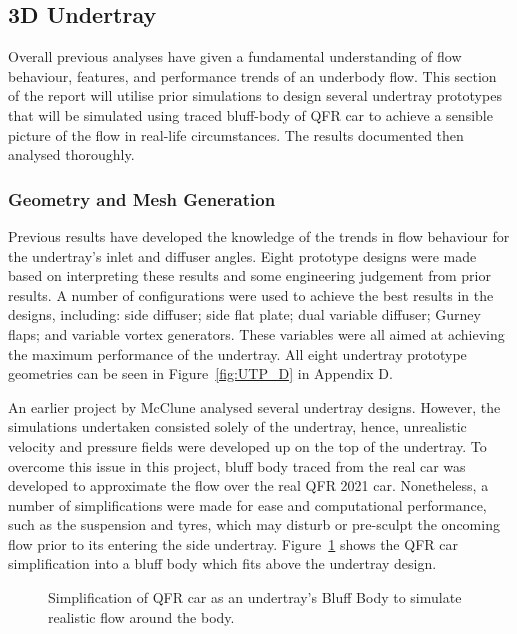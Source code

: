 
\subsection{3D Undertray}
Overall previous analyses have given a fundamental understanding of flow behaviour, features, and performance trends of an underbody flow. This section of the report will utilise prior simulations to design several undertray prototypes that will be simulated using traced bluff-body of QFR car to achieve a sensible picture of the flow in real-life circumstances. The results documented then analysed thoroughly.

\subsubsection{Geometry and Mesh Generation}
\noindent Previous results have developed the knowledge of the trends in flow behaviour for the undertray's inlet and diffuser angles. Eight prototype designs were made based on interpreting these results and some engineering judgement from prior results. A number of configurations were used to achieve the best results in the designs, including: side diffuser; side flat plate; dual variable diffuser; Gurney flaps; and variable vortex generators. These variables were all aimed at achieving the maximum performance of the undertray. All eight undertray prototype geometries can be seen in Figure~\ref{fig:UTP_D} in Appendix D.

\noindent An earlier project by McClune \cite{McClune2018DesignCar} analysed several undertray designs. However, the simulations undertaken consisted solely of the undertray, hence, unrealistic velocity and pressure fields were developed up on the top of the undertray. To overcome this issue in this project, bluff body traced from the real car was developed to approximate the flow over the real QFR 2021 car. Nonetheless, a number of simplifications were made for ease and computational performance, such as the suspension and tyres, which may disturb or pre-sculpt the oncoming flow prior to its entering the side undertray. Figure~\ref{fig:3D_UT_BB_SIMPLIFICATION} shows the QFR car simplification into a bluff body which fits above the undertray design.

\begin{figure}[!htb] 
    \centering
    \noindent{}
    \caption{Simplification of QFR car as an undertray's Bluff Body to simulate realistic flow around the body.}
      \label{fig:3D_UT_BB_SIMPLIFICATION}
\end{figure}

